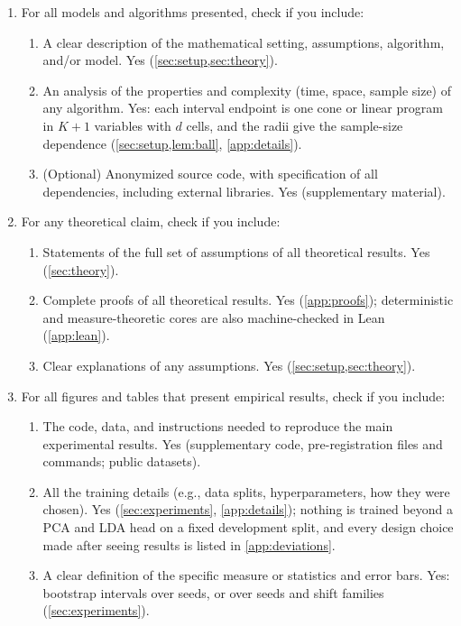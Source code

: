 \documentclass[twoside]{article}
\begin{document}
\begin{enumerate}
  \item For all models and algorithms presented, check if you include:
  \begin{enumerate}
    \item A clear description of the mathematical setting, assumptions, algorithm, and/or model. Yes
    (\cref{sec:setup,sec:theory}).
    \item An analysis of the properties and complexity (time, space, sample size) of any algorithm. Yes:
    each interval endpoint is one cone or linear program in $K+1$ variables with $d$ cells, and the radii
    give the sample-size dependence (\cref{sec:setup,lem:ball}, \cref{app:details}).
    \item (Optional) Anonymized source code, with specification of all dependencies, including external
    libraries. Yes (supplementary material).
  \end{enumerate}
  \item For any theoretical claim, check if you include:
  \begin{enumerate}
    \item Statements of the full set of assumptions of all theoretical results. Yes (\cref{sec:theory}).
    \item Complete proofs of all theoretical results. Yes (\cref{app:proofs}); deterministic and
    measure-theoretic cores are also machine-checked in Lean (\cref{app:lean}).
    \item Clear explanations of any assumptions. Yes (\cref{sec:setup,sec:theory}).
  \end{enumerate}
  \item For all figures and tables that present empirical results, check if you include:
  \begin{enumerate}
    \item The code, data, and instructions needed to reproduce the main experimental results. Yes
    (supplementary code, pre-registration files and commands; public datasets).
    \item All the training details (e.g., data splits, hyperparameters, how they were chosen). Yes
    (\cref{sec:experiments}, \cref{app:details}); nothing is trained beyond a PCA and LDA head on a fixed
    development split, and every design choice made after seeing results is listed in
    \cref{app:deviations}.
    \item A clear definition of the specific measure or statistics and error bars. Yes: bootstrap
    intervals over seeds, or over seeds and shift families (\cref{sec:experiments}).

\end{enumerate}
\end{enumerate}
\end{document}
